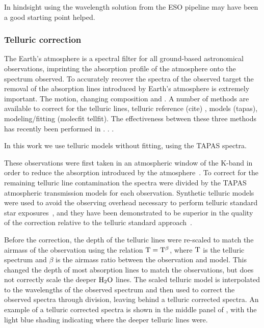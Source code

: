 




In hindsight using the wavelength solution from the ESO pipeline may have been a good starting point helped.

\subsubsection{Telluric correction}
\label{subsec:telluric_correction}
The Earth's atmosphere is a spectral filter for all ground-based astronomical observations, imprinting the absorption profile of the atmosphere onto the spectrum observed. To accurately recover the spectra of the observed target the removal of the absorption lines introduced by Earth's atmosphere is extremely important. The motion, changing composition and .
A number of methods are available to correct for the telluric lines, telluric reference (cite) , models (tapas), modeling/fitting (molecfit tellfit). The effectiveness between these three methods has recently been performed in \cite{ulmer-moll_telluric_2018}.   . .

In this work we use telluric models without fitting, using the TAPAS spectra.

These observations were first taken in an atmospheric window of the K-band in order to reduce the absorption introduced by the atmosphere~\citep{barnes_hd_2008}. 
 To correct for the remaining telluric line contamination the spectra were divided by the TAPAS\citep{bertaux_tapas_2014} atmospheric transmission models for each observation. Synthetic telluric models were used to avoid the observing overhead necessary to perform telluric standard star exposures~\citep{vacca_method_2003}, and they have been demonstrated to be superior in the quality of the correction relative to the telluric standard approach~\citep[e.g.][]{cotton_atmospheric_2014}.

Before the correction, the depth of the telluric lines were re-scaled to match the airmass of the observation using the relation \(\rm T = T^{\beta} \), where \(\rm T\) is the telluric spectrum and \(\beta \) is the airmass ratio between the observation and model. This changed the depth of most absorption lines to match the observations, but does not correctly scale the deeper \(\rm H_{2}O \) lines. The scaled telluric model is interpolated to the wavelengths of the observed spectrum and then used to correct the observed spectra through division, leaving behind a telluric corrected spectra. An example of a telluric corrected spectra is shown in the middle panel of , with the light blue shading indicating where the deeper telluric lines were.

